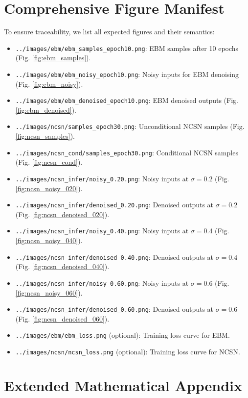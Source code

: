 \documentclass[a4paper,12pt]{article}
\begin{document}
\section{Comprehensive Figure Manifest}
To ensure traceability, we list all expected figures and their semantics:
\begin{itemize}[leftmargin=*]
    \item \texttt{../images/ebm/ebm\_samples\_epoch10.png}: EBM samples after 10 epochs (Fig. \ref{fig:ebm_samples}).
    \item \texttt{../images/ebm/ebm\_noisy\_epoch10.png}: Noisy inputs for EBM denoising (Fig. \ref{fig:ebm_noisy}).
    \item \texttt{../images/ebm/ebm\_denoised\_epoch10.png}: EBM denoised outputs (Fig. \ref{fig:ebm_denoised}).
    \item \texttt{../images/ncsn/samples\_epoch30.png}: Unconditional NCSN samples (Fig. \ref{fig:ncsn_samples}).
    \item \texttt{../images/ncsn\_cond/samples\_epoch30.png}: Conditional NCSN samples (Fig. \ref{fig:ncsn_cond}).
    \item \texttt{../images/ncsn\_infer/noisy\_0.20.png}: Noisy inputs at $\sigma=0.2$ (Fig. \ref{fig:ncsn_noisy_020}).
    \item \texttt{../images/ncsn\_infer/denoised\_0.20.png}: Denoised outputs at $\sigma=0.2$ (Fig. \ref{fig:ncsn_denoised_020}).
    \item \texttt{../images/ncsn\_infer/noisy\_0.40.png}: Noisy inputs at $\sigma=0.4$ (Fig. \ref{fig:ncsn_noisy_040}).
    \item \texttt{../images/ncsn\_infer/denoised\_0.40.png}: Denoised outputs at $\sigma=0.4$ (Fig. \ref{fig:ncsn_denoised_040}).
    \item \texttt{../images/ncsn\_infer/noisy\_0.60.png}: Noisy inputs at $\sigma=0.6$ (Fig. \ref{fig:ncsn_noisy_060}).
    \item \texttt{../images/ncsn\_infer/denoised\_0.60.png}: Denoised outputs at $\sigma=0.6$ (Fig. \ref{fig:ncsn_denoised_060}).
    \item \texttt{../images/ebm/ebm\_loss.png} (optional): Training loss curve for EBM.
    \item \texttt{../images/ncsn/ncsn\_loss.png} (optional): Training loss curve for NCSN.
\end{itemize}

\section{Extended Mathematical Appendix}
\end{document}
